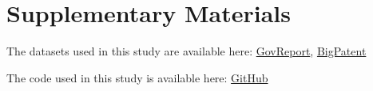 

\section*{Supplementary Materials}

The datasets used in this study are available here:
\href{https://gov-report-data.github.io/}{GovReport},
\href{https://evasharma.github.io/bigpatent/}{BigPatent}

The code used in this study is available here:
\href{https://github.com/NamanChhibbar/Long-Document-Summarizer.git}{GitHub}
